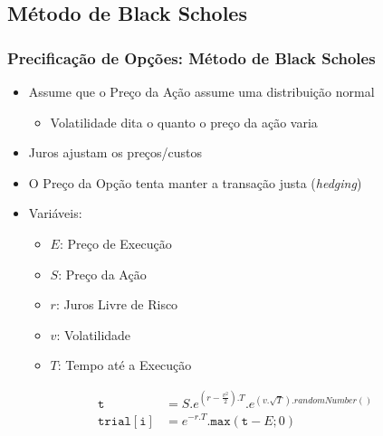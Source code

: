 \documentclass{beamer}
\begin{document}
\begin{frame}

\subsection{Método de Black Scholes}
\frametitle{Precificação de Opções: Método de Black Scholes}
	
\begin{itemize}
	\item Assume que o Preço da Ação assume uma distribuição normal
	\begin{itemize}
		\item Volatilidade dita o quanto o preço da ação varia
	\end{itemize}
	\item Juros ajustam os preços/custos
	\item O Preço da Opção tenta manter a transação justa (\textit{hedging})
	\item Variáveis:
	\begin{itemize}
		\item $E$: Preço de Execução
		\item $S$: Preço da Ação
		\item $r$: Juros Livre de Risco
		\item $v$: Volatilidade
		\item $T$: Tempo até a Execução
	\end{itemize}
\end{itemize}

\begin{equation}
	\begin{aligned}
		\mathtt{t}			&= S.e^{(r-\frac{v^2}{2}).T}.e^{(v.\sqrt{T}).randomNumber()}\\
		\mathtt{trial[i]}	&= e^{-r.T}.\mathtt{max}(\mathtt{t}-E;0)\\
	\end{aligned}
\end{equation}

\end{frame}

\end{document}
